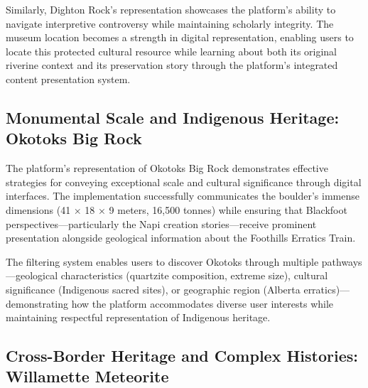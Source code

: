 Similarly, Dighton Rock's representation showcases the platform's ability to navigate interpretive controversy while maintaining scholarly integrity. The museum location becomes a strength in digital representation, enabling users to locate this protected cultural resource while learning about both its original riverine context and its preservation story through the platform's integrated content presentation system.

\subsection{Monumental Scale and Indigenous Heritage: Okotoks Big Rock}
\label{subsec:monumental_scale}

The platform's representation of Okotoks Big Rock demonstrates effective strategies for conveying exceptional scale and cultural significance through digital interfaces. The implementation successfully communicates the boulder's immense dimensions (41 × 18 × 9 meters, 16,500 tonnes) while ensuring that Blackfoot perspectives—particularly the Napi creation stories—receive prominent presentation alongside geological information about the Foothills Erratics Train.


The filtering system enables users to discover Okotoks through multiple pathways—geological characteristics (quartzite composition, extreme size), cultural significance (Indigenous sacred sites), or geographic region (Alberta erratics)—demonstrating how the platform accommodates diverse user interests while maintaining respectful representation of Indigenous heritage.

\subsection{Cross-Border Heritage and Complex Histories: Willamette Meteorite}
\label{subsec:cross_border_heritage}


